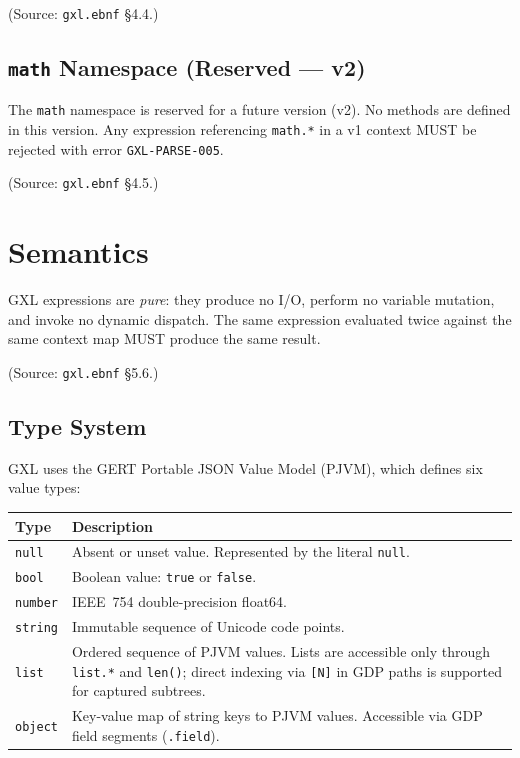 (Source: \texttt{gxl.ebnf} \S4.4.)

\subsection{\texttt{math} Namespace (Reserved --- v2)}
\label{subsec:gxl:stdlib:math}

The \texttt{math} namespace is reserved for a future version (v2).
No methods are defined in this version.
Any expression referencing \texttt{math.*} in a v1 context MUST be rejected
with error \texttt{GXL-PARSE-005}.

(Source: \texttt{gxl.ebnf} \S4.5.)

\section{Semantics}
\label{sec:gxl:semantics}

GXL expressions are \emph{pure}: they produce no I/O, perform no variable
mutation, and invoke no dynamic dispatch.
The same expression evaluated twice against the same context map MUST produce
the same result.

(Source: \texttt{gxl.ebnf} \S5.6.)

\subsection{Type System}
\label{sec:gxl:semantics:types}

GXL uses the GERT Portable JSON Value Model (PJVM), which defines six value
types:

\begin{center}
\begin{tabular}{lp{10cm}}
\hline
\textbf{Type}   & \textbf{Description} \\
\hline
\texttt{null}   & Absent or unset value.
                  Represented by the literal \texttt{null}. \\
\texttt{bool}   & Boolean value: \texttt{true} or \texttt{false}. \\
\texttt{number} & IEEE~754 double-precision float64. \\
\texttt{string} & Immutable sequence of Unicode code points. \\
\texttt{list}   & Ordered sequence of PJVM values.
                  Lists are accessible only through \texttt{list.*}
                  and \texttt{len()}; direct indexing via \texttt{[N]}
                  in GDP paths is supported for captured subtrees. \\
\texttt{object} & Key-value map of string keys to PJVM values.
                  Accessible via GDP field segments (\texttt{.field}). \\
\hline
\end{tabular}
\end{center}

